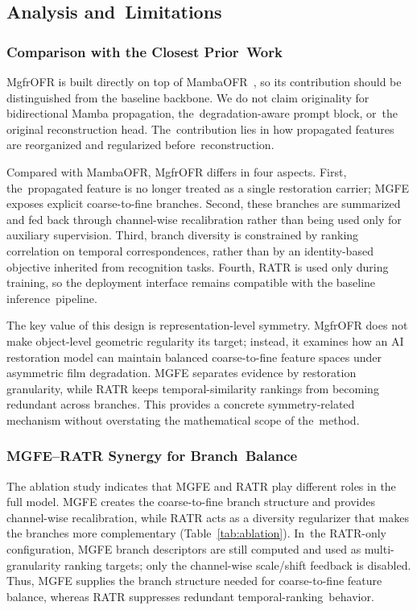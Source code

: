 \documentclass[symmetry,article,accept,pdftex,moreauthors]{Definitions/mdpi}
\begin{document}
\FloatBarrier

%
\subsection{Analysis and~Limitations}
\label{subsec:analysis_limitations}

\subsubsection{Comparison with the Closest Prior~Work}
\label{subsec:vs_mambaofr}

MgfrOFR is built directly on top of MambaOFR~\cite{mao2025mambaofr}, so its contribution should be distinguished from the baseline backbone. We do not claim originality for bidirectional Mamba propagation, the~degradation-aware prompt block, or~the original reconstruction head. The~contribution lies in how propagated features are reorganized and regularized before~reconstruction.

Compared with MambaOFR, MgfrOFR differs in four aspects. First, the~propagated feature is no longer treated as a single restoration carrier; MGFE exposes explicit coarse-to-fine branches. Second, these branches are summarized and fed back through channel-wise recalibration rather than being used only for auxiliary supervision. Third, branch diversity is constrained by ranking correlation on temporal correspondences, rather than by an identity-based objective inherited from recognition tasks. Fourth, RATR is used only during training, so the deployment interface remains compatible with the baseline inference~pipeline.

The key value of this design is representation-level symmetry. MgfrOFR does not make object-level geometric regularity its target; instead, it examines how an AI restoration model can maintain balanced coarse-to-fine feature spaces under asymmetric film degradation. MGFE separates evidence by restoration granularity, while RATR keeps temporal-similarity rankings from becoming redundant across branches. This provides a concrete symmetry-related mechanism without overstating the mathematical scope of the~method.

\subsubsection{MGFE--RATR Synergy for Branch~Balance}
\label{subsec:synergy}

The ablation study indicates that MGFE and RATR play different roles in the full model. MGFE creates the coarse-to-fine branch structure and provides channel-wise recalibration, while RATR acts as a diversity regularizer that makes the branches more complementary (Table~\ref{tab:ablation}). In~the RATR-only configuration, MGFE branch descriptors are still computed and used as multi-granularity ranking targets; only the channel-wise scale/shift feedback is disabled. Thus, MGFE supplies the branch structure needed for coarse-to-fine feature balance, whereas RATR suppresses redundant temporal-ranking~behavior.
\end{document}
